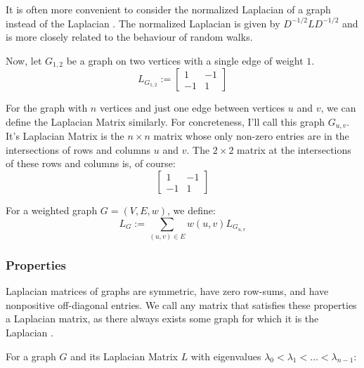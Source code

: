 It is often more convenient to consider the normalized Laplacian of a graph
instead of the Laplacian \cite{Spielman:2010}. The normalized Laplacian is given
by $D^{-1/2}LD^{-1/2}$ and is more closely related to the behaviour of random
walks.

Now, let $G_{1,2}$ be a graph on two vertices with a single edge of weight $1$.
\begin{equation}
L_{G_{1,2}} :=
    \begin{bmatrix}
        1 & -1\\
        -1 & 1
    \end{bmatrix}
\end{equation}

For the graph with $n$ vertices and just one edge between vertices $u$ and $v$,
we can define the Laplacian Matrix similarly. For concreteness, I'll call this
graph $G_{u,v}$. It's Laplacian Matrix is the $n \times n$ matrix whose only
non-zero entries are in the intersections of rows and columns $u$ and $v$. The
$2 \times 2$ matrix at the intersections of these rows and columns is, of
course:
\begin{equation}
    \begin{bmatrix}
        1 & -1\\
        -1 & 1
    \end{bmatrix}
\end{equation}

For a weighted graph $G = (V,E,w)$, we define:
\begin{equation}
L_G := \sum_{(u,v) \in E} w(u,v)L_{G_{u,v}}
\end{equation}

\subsubsection{Properties}
\label{laplacianMatrices:properties}
Laplacian matrices of graphs are symmetric, have zero row-sums, and have
nonpositive off-diagonal entries. We call any matrix that satisfies these
properties a Laplacian matrix, as there always exists some graph for which it is
the Laplacian \cite{Spielman:2010}.

For a graph $G$ and its Laplacian Matrix $L$ with eigenvalues $\lambda_0<
\lambda_1<\ldots<\lambda_{n-1}$:

